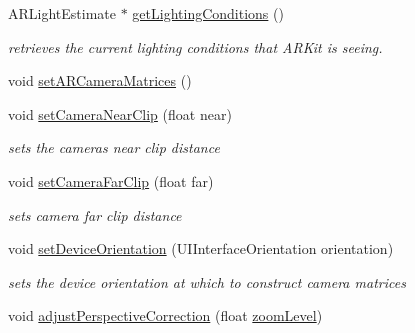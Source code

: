 \begin{DoxyCompactItemize}
\mbox{\label{class_a_r_core_1_1_a_r_cam_ad11f88524d97445892956def3864523e}} 
A\+R\+Light\+Estimate $\ast$ \hyperlink{class_a_r_core_1_1_a_r_cam_ad11f88524d97445892956def3864523e}{get\+Lighting\+Conditions} ()
\begin{DoxyCompactList}\small\item\em retrieves the current lighting conditions that A\+R\+Kit is seeing. \end{DoxyCompactList}\item 
void \hyperlink{class_a_r_core_1_1_a_r_cam_ac554b8254ea4a22f122f25542694dafa}{set\+A\+R\+Camera\+Matrices} ()
\item 
\mbox{\label{class_a_r_core_1_1_a_r_cam_a040d67ba6abb95e914760ca6e64ac664}} 
void \hyperlink{class_a_r_core_1_1_a_r_cam_a040d67ba6abb95e914760ca6e64ac664}{set\+Camera\+Near\+Clip} (float near)
\begin{DoxyCompactList}\small\item\em sets the camera\textquotesingle{}s near clip distance \end{DoxyCompactList}\item 
\mbox{\label{class_a_r_core_1_1_a_r_cam_aa29191b58c0e6613850916526c6ab380}} 
void \hyperlink{class_a_r_core_1_1_a_r_cam_aa29191b58c0e6613850916526c6ab380}{set\+Camera\+Far\+Clip} (float far)
\begin{DoxyCompactList}\small\item\em sets camera far clip distance \end{DoxyCompactList}\item 
\mbox{\label{class_a_r_core_1_1_a_r_cam_a3f665c86924ad4b6d3c5e4e50793d132}} 
void \hyperlink{class_a_r_core_1_1_a_r_cam_a3f665c86924ad4b6d3c5e4e50793d132}{set\+Device\+Orientation} (U\+I\+Interface\+Orientation orientation)
\begin{DoxyCompactList}\small\item\em sets the device orientation at which to construct camera matrices \end{DoxyCompactList}\item 
\mbox{\label{class_a_r_core_1_1_a_r_cam_ae2ecd3007e6684d1686c89d2ac3e7020}} 
void \hyperlink{class_a_r_core_1_1_a_r_cam_ae2ecd3007e6684d1686c89d2ac3e7020}{adjust\+Perspective\+Correction} (float \hyperlink{class_a_r_core_1_1_a_r_cam_ac17d3b7fd12f51b2c54b7241efd36cd4}{zoom\+Level})

\end{DoxyCompactItemize}
